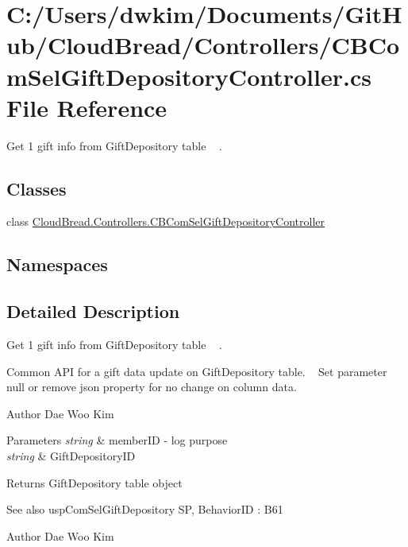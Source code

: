 \hypertarget{a00125}{}\section{C\+:/\+Users/dwkim/\+Documents/\+Git\+Hub/\+Cloud\+Bread/\+Controllers/\+C\+B\+Com\+Sel\+Gift\+Depository\+Controller.cs File Reference}
\label{a00125}


Get 1 gift info from Gift\+Depository table ~\newline
.  


\subsection*{Classes}
\begin{DoxyCompactItemize}
\item 
class \hyperlink{a00014}{Cloud\+Bread.\+Controllers.\+C\+B\+Com\+Sel\+Gift\+Depository\+Controller}
\end{DoxyCompactItemize}
\subsection*{Namespaces}
\begin{DoxyCompactItemize}
\end{DoxyCompactItemize}


\subsection{Detailed Description}
Get 1 gift info from Gift\+Depository table ~\newline
. 

Common A\+PI for a gift data update on Gift\+Depository table. ~\newline
Set parameter null or remove json property for no change on column data.

\begin{DoxyAuthor}{Author}
Dae Woo Kim 
\end{DoxyAuthor}

\begin{DoxyParams}{Parameters}
{\em string} & member\+ID -\/ log purpose \\
\hline
{\em string} & Gift\+Depository\+ID \\
\hline
\end{DoxyParams}
\begin{DoxyReturn}{Returns}
Gift\+Depository table object 
\end{DoxyReturn}
\begin{DoxySeeAlso}{See also}
usp\+Com\+Sel\+Gift\+Depository SP, Behavior\+ID \+: B61
\end{DoxySeeAlso}
\begin{DoxyAuthor}{Author}
Dae Woo Kim 
\end{DoxyAuthor}

